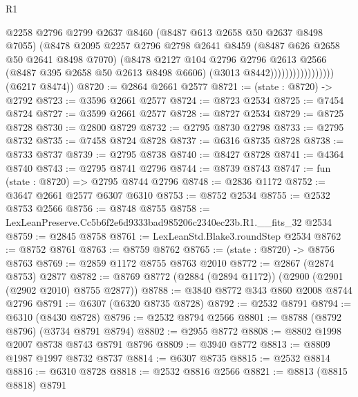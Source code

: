 \begin{lexlean}{R1}
\begin{coremodule}
                                  @2258
                                  @2796
                                  @2799
                                  @2637
                                  @8460
                                  (@8487 @613 @2658 @50 @2637 @8498 @7055)
                                  (@8478
                                    @2095
                                    @2257
                                    @2796
                                    @2798
                                    @2641
                                    @8459
                                    (@8487 @626 @2658 @50 @2641 @8498 @7070)
                                    (@8478
                                      @2127
                                      @104
                                      @2796
                                      @2796
                                      @2613
                                      @2566
                                      (@8487 @395 @2658 @50 @2613 @8498 @6606)
                                      (@3013 @8442)))))))))))))))))
      (@6217 @8474))
@8720 := @2864 @2661 @2577
@8721 := (state : @8720) -> @2792
@8723 := @3596 @2661 @2577
@8724 := @8723 @2534
@8725 := @7454 @8724
@8727 := @3599 @2661 @2577
@8728 := @8727 @2534
@8729 := @8725 @8728
@8730 := @2800 @8729
@8732 := @2795 @8730 @2798
@8733 := @2795 @8732
@8735 := @7458 @8724 @8728
@8737 := @6316 @8735 @8728
@8738 := @8733 @8737
@8739 := @2795 @8738
@8740 := @8427 @8728
@8741 := @4364 @8740
@8743 := @2795 @8741 @2796
@8744 := @8739 @8743
@8747 := fun (state : @8720) => @2795 @8744 @2796
@8748 := @2836 @1172
@8752 := @3647 @2661 @2577 @6307 @6310
@8753 := @8752 @2534
@8755 := @2532 @8753 @2566
@8756 := @8748 @8755
@8758 := LexLeanPreserve.Cc5b6f2e6d9333bad985206c2340ec23b.R1.__fits_32 @2534
@8759 := @2845 @8758
@8761 := LexLeanStd.Blake3.roundStep @2534
@8762 := @8752 @8761
@8763 := @8759 @8762
@8765 := (state : @8720) -> @8756 @8763
@8769 := @2859 @1172 @8755 @8763 @2010
@8772 := @2867 (@2874 @8753) @2877
@8782 := @8769 @8772 (@2884 (@2894 @1172)) (@2900 (@2901 (@2902 @2010) @8755 @2877))
@8788 := @3840 @8772 @343 @860 @2008 @8744 @2796
@8791 := @6307 (@6320 @8735 @8728)
@8792 := @2532 @8791
@8794 := @6310 (@8430 @8728)
@8796 := @2532 @8794 @2566
@8801 := @8788 (@8792 @8796) (@3734 @8791 @8794)
@8802 := @2955 @8772
@8808 := @8802 @1998 @2007 @8738 @8743 @8791 @8796
@8809 := @3940 @8772
@8813 := @8809 @1987 @1997 @8732 @8737
@8814 := @6307 @8735
@8815 := @2532 @8814
@8816 := @6310 @8728
@8818 := @2532 @8816 @2566
@8821 := @8813 (@8815 @8818) @8791

\end{coremodule}
\end{lexlean}
